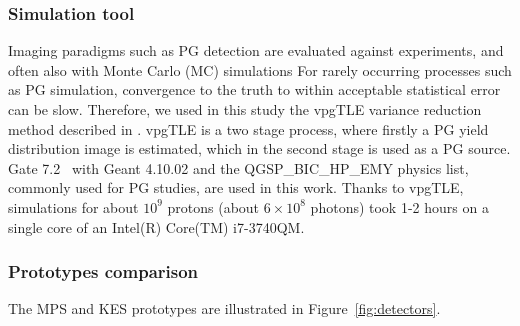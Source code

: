 \documentclass[a4paper,english,12pt]{article}
\begin{document}
\subsubsection{Simulation tool}\label{sec:SimTool}

Imaging paradigms such as PG detection are evaluated against experiments, and often also with Monte Carlo (MC) simulations %
For rarely occurring processes such as PG simulation, convergence to the truth to within acceptable statistical error can be slow. Therefore, we used in this study the vpgTLE variance reduction method described in \cite{Huisman2016}. vpgTLE is a two stage process, where firstly a PG yield distribution image is estimated, which in the second stage is used as a PG source. Gate 7.2~\citep{Sarrut2014} with Geant 4.10.02 and the QGSP\_BIC\_HP\_EMY physics list, commonly used for PG studies, are used in this work. Thanks to vpgTLE, simulations for about $10^9$ protons (about $6\times10^8$ photons) took 1-2 hours on a single core of an Intel(R) Core(TM) i7-3740QM.


\subsubsection{Prototypes comparison}\label{sec:camera} %

The MPS and KES prototypes are illustrated in Figure~\ref{fig:detectors}.
\end{document}
